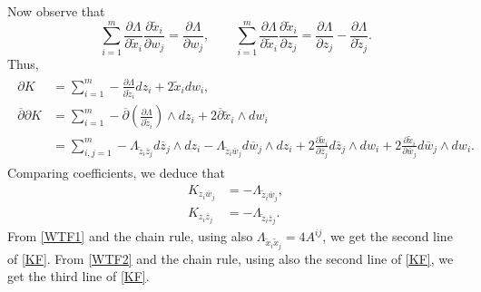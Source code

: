 \documentclass[11pt,reqno]{amsart}
\theoremstyle{plain}
\theoremstyle{definition}
\numberwithin{equation}{section}
\begin{document}
Now observe that 
$$\sum_{i=1}^{m}\frac{\partial \Lambda}{\partial \tilde{x}_i}\frac{\partial \tilde{x}_{i}}{\partial w_{j}}= \frac{\partial \Lambda}{\partial w_j},\quad   \quad \sum_{i=1}^m \frac{\partial \Lambda}{\partial\tilde{x}_i}\frac{\partial \tilde{x}_i}{\partial z_j} = \frac{\partial \Lambda}{\partial z_j} - \frac{\partial \Lambda}{\partial \tilde{z}_j}.$$
Thus,
\begin{align*}\begin{split}\partial K&=\sum_{i=1}^{m}-\frac{\partial \Lambda}{\partial \tilde{z}_{i}}dz_{i}+2\tilde{x}_{i}dw_{i},\\
     \overline{\partial}\partial K & = \sum_{i=1}^m -\overline{\partial}\left( \frac{\partial \Lambda}{\partial \tilde{z}_{i}}\right)\wedge d z_{i}  + 2\overline{\partial}\tilde{x}_{i}\wedge dw_{i}\\
     & = \sum_{i,j=1}^m -\Lambda_{\tilde{z}_i\overline{z}_j}d\overline{z}_j \wedge dz_i - \Lambda_{\tilde{z}_i \overline{w}_j}d\overline{w}_j \wedge dz_i + 2\frac{\partial\tilde{x}_i}{\partial \overline{z}_j}d\overline{z}_j \wedge dw_i + 2\frac{\partial \tilde{x}_i}{\partial \overline{w}_j} d\overline{w}_j \wedge dw_i.
\end{split}\end{align*}
Comparing coefficients, we deduce that 
\begin{align}
K_{z_i\overline{w}_j} &=
-\Lambda_{\tilde{z}_i\overline{w}_j},\label{WTF1}\\
K_{z_i\overline{z}_j} &= -\Lambda_{\tilde{z}_i\overline{z}_j}.\label{WTF2}
\end{align}
From \eqref{WTF1} and the chain rule, using also $\Lambda_{\tilde{x}_i\tilde{x}_j} = 4A^{ij}$, we get the second line of \eqref{KF}. 
From \eqref{WTF2} and the chain rule, using also the second line of \eqref{KF}, we get the third line of \eqref{KF}.
\end{document}
